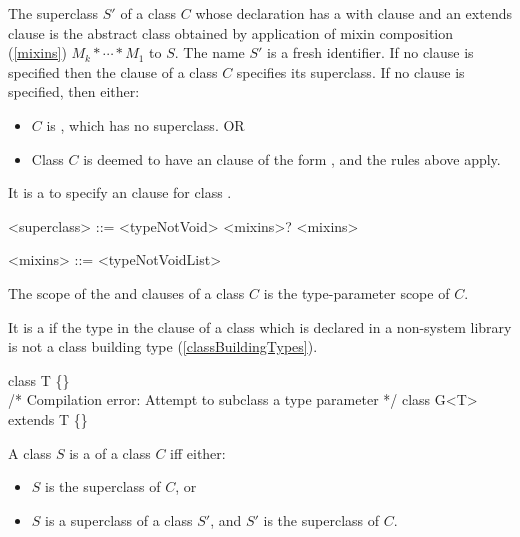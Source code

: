 \documentclass[makeidx]{article}
\begin{document}
\LMHash{}%
The superclass $S'$ of a class $C$ whose declaration has a with clause
and an extends clause
is the abstract class obtained by application of
mixin composition (\ref{mixins}) $M_k* \cdots * M_1$ to $S$.
The name $S'$ is a fresh identifier.
If no \WITH{} clause is specified then the \EXTENDS{} clause of
a class $C$ specifies its superclass.
If no \EXTENDS{} clause is specified, then either:
\begin{itemize}
\item $C$ is , which has no superclass. OR
\item Class $C$ is deemed to have an \EXTENDS{} clause of the form
  , and the rules above apply.
\end{itemize}

\LMHash{}%
It is a  to specify an \EXTENDS{} clause
for class .

\begin{grammar}
<superclass> ::= \EXTENDS{} <typeNotVoid> <mixins>?
    \alt <mixins>

<mixins> ::= \WITH{} <typeNotVoidList>
\end{grammar}

\LMHash{}%
The scope of the \EXTENDS{} and \WITH{} clauses of a class $C$ is
the type-parameter scope of $C$.

\LMHash{}%
It is a  if the type
in the \EXTENDS{} clause of a class
which is declared in a non-system library
is not a class building type
(\ref{classBuildingTypes}).


\begin{dartCode}
class T \{\}
\\
/* Compilation error: Attempt to subclass a type parameter */
class G<T> extends T \{\}
\end{dartCode}

\LMHash{}%
A class $S$ is a  of a class $C$ if{}f either:
\begin{itemize}
\item $S$ is the superclass of $C$, or
\item $S$ is a superclass of a class $S'$,
  and $S'$ is the superclass of $C$.
\end{itemize}
\end{document}

